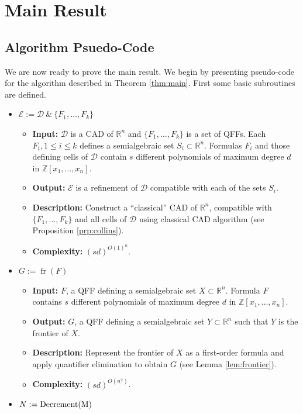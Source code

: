 \documentclass[
]{book}
\providecommand{\tightlist}{%
  \setlength{\itemsep}{0pt}\setlength{\parskip}{0pt}}
\theoremstyle{definition}
\theoremstyle{definition}
\theoremstyle{definition}
\theoremstyle{definition}
\theoremstyle{remark}
\begin{document}
\hypertarget{main-result}{%
\section{Main Result}\label{main-result}}

\hypertarget{algorithm-psuedo-code}{%
\subsection{Algorithm Psuedo-Code}\label{algorithm-psuedo-code}}

We are now ready to prove the main result. We begin by presenting pseudo-code for the algorithm described in Theorem \ref{thm:main}.
First some basic subroutines are defined.

\begin{itemize}
\tightlist
\item
  \(\mathcal{E} := \mathcal{D} \ \&\ \{F_1,\ldots,F_k\}\)

  \begin{itemize}
  \tightlist
  \item
    \textbf{Input:} \(\mathcal{D}\) is a CAD of \(\mathbb{R}^n\) and \(\{ F_1, \ldots, F_k \}\) is a set of QFFs. Each \(F_i, 1 \le i \le k\) defines a semialgebraic set \(S_i \subset \mathbb{R}^n\). Formulas \(F_i\) and those defining cells of \(\mathcal{D}\) contain \(s\) different polynomials of maximum degree \(d\) in \(\mathbb{Z}[x_1,\ldots,x_n]\).
  \item
    \textbf{Output:} \(\mathcal{E}\) is a refinement of \(\mathcal{D}\) compatible with each of the sets \(S_i\).
  \item
    \textbf{Description:} Construct a ``classical'' CAD of \(\mathbb{R}^n\), compatible with \(\{ F_1, \ldots, F_k \}\) and all cells of \(\mathcal{D}\) using classical CAD algorithm (see Proposition \ref{prp:collins}).
  \item
    \textbf{Complexity:} \((sd)^{O(1)^{n}}\).
  \end{itemize}
\item
  \(G := {\operatorname{fr} \left( F \right)}\)

  \begin{itemize}
  \tightlist
  \item
    \textbf{Input:} \(F\), a QFF defining a semialgebraic set \(X \subset \mathbb{R}^n\). Formula \(F\) contains \(s\) different polynomials of maximum degree \(d\) in \(\mathbb{Z}[x_1,\ldots,x_n]\).
  \item
    \textbf{Output:} \(G\), a QFF defining a semialgebraic set \(Y \subset \mathbb{R}^n\) such that \(Y\) is the frontier of \(X\).
  \item
    \textbf{Description:} Represent the frontier of \(X\) as a first-order formula and apply quantifier elimination to obtain \(G\) (see Lemma \ref{lem:frontier}).
  \item
    \textbf{Complexity:} \((sd)^{O(n^2)}\).
  \end{itemize}
\item
  \(N := \rm{Decrement}(M)\)


\end{itemize}
\end{document}
